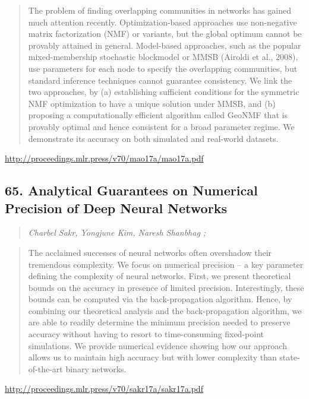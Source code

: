 \documentclass{article}
\begin{document}
\begin{quote}
    The problem of finding overlapping communities in networks has gained much attention recently. Optimization-based approaches use non-negative matrix factorization (NMF) or variants, but the global optimum cannot be provably attained in general. Model-based approaches, such as the popular mixed-membership stochastic blockmodel or MMSB (Airoldi et al., 2008), use parameters for each node to specify the overlapping communities, but standard inference techniques cannot guarantee consistency. We link the two approaches, by (a) establishing sufficient conditions for the symmetric NMF optimization to have a unique solution under MMSB, and (b) proposing a computationally efficient algorithm called GeoNMF that is provably optimal and hence consistent for a broad parameter regime. We demonstrate its accuracy on both simulated and real-world datasets.  
\end{quote}

\href{http://proceedings.mlr.press/v70/mao17a/mao17a.pdf}{http://proceedings.mlr.press/v70/mao17a/mao17a.pdf}

\subsection{65. Analytical Guarantees on Numerical Precision of Deep Neural Networks}

\begin{quote}
\footnotesize{\textit{Charbel Sakr, Yongjune Kim, Naresh Shanbhag ;}}

\end{quote}

\begin{quote}
    The acclaimed successes of neural networks often overshadow their tremendous complexity. We focus on numerical precision – a key parameter defining the complexity of neural networks. First, we present theoretical bounds on the accuracy in presence of limited precision. Interestingly, these bounds can be computed via the back-propagation algorithm. Hence, by combining our theoretical analysis and the back-propagation algorithm, we are able to readily determine the minimum precision needed to preserve accuracy without having to resort to time-consuming fixed-point simulations. We provide numerical evidence showing how our approach allows us to maintain high accuracy but with lower complexity than state-of-the-art binary networks.  
\end{quote}

\href{http://proceedings.mlr.press/v70/sakr17a/sakr17a.pdf}{http://proceedings.mlr.press/v70/sakr17a/sakr17a.pdf}
\end{document}
